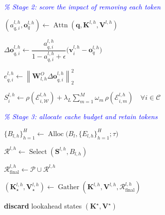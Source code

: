 \documentclass{article} %
\begin{document}
\begin{algorithm}[t]
\begin{algorithmic}[1]
\Statex \textcolor{blue}{\textit{\% Stage 2: score the impact of removing each token}}



        \State $(a^{l,h}_{q,i},\mathbf{o}^{l,h}_{q})
        \gets
        \operatorname{Attn}
        (\mathbf{q},\mathbf{K}^{l,h},\mathbf{V}^{l,h})$

        \State $\Delta\mathbf{o}^{l,h}_{q,i}
        \gets
        \dfrac{a^{l,h}_{q,i}}
        {1-a^{l,h}_{q,i}+\epsilon}
        \big(\mathbf{v}^{l,h}_{i}-\mathbf{o}^{l,h}_{q}\big)$

        \State $e^{l,h}_{q,i}
        \gets
        \left\|
        \mathbf{W}^{O}_{l,h}
        \Delta\mathbf{o}^{l,h}_{q,i}
        \right\|_2^2$

    \EndFor

    \State $S^{l,h}_{i}
    \gets
    \rho(\mathcal{E}^{l,h}_{i,\mathcal{W}})
    +
    \lambda_L
    \sum_{m=1}^{M}
    \omega_m\,
    \rho(\mathcal{E}^{l,h}_{i,m})
    \quad \forall i\in\mathcal{C}$

    \Statex \textcolor{blue}{\textit{\% Stage 3: allocate cache budget and retain tokens}}

    \State $\{B_{l,h}\}_{h=1}^{H}
    \gets
    \operatorname{Alloc}
    \big(B_l,\{E_{l,h}\}_{h=1}^{H};\tau\big)$


        \State $\mathcal{R}^{l,h}
        \gets
        \operatorname{Select}
        (\mathbf{S}^{l,h},B_{l,h})$

        \State $\mathcal{R}^{l,h}_{\mathrm{final}}
        \gets
        \mathcal{P}\cup\mathcal{R}^{l,h}$

        \State $(\mathbf{K}^{l,h}_{\star},
        \mathbf{V}^{l,h}_{\star})
        \gets
        \operatorname{Gather}
        (\mathbf{K}^{l,h},
        \mathbf{V}^{l,h},
        \mathcal{R}^{l,h}_{\mathrm{final}})$

    \EndFor

\EndFor

\State \textbf{discard} lookahead states
\State \Return $(\mathbf{K}^{\star},\mathbf{V}^{\star})$

\end{algorithmic}
\end{algorithm}
\end{document}
